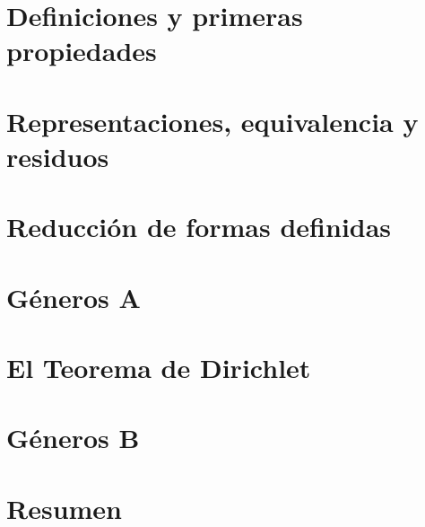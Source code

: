 \section{Definiciones y primeras propiedades}\label{sec:definiciones}


\section{Representaciones, equivalencia y residuos}\label{sec:representaciones}


\section{Reducci\'on de formas definidas}\label{sec:reducidas}


\section{G\'eneros A}\label{sec:generos:a}


\section{El Teorema de Dirichlet}\label{sec:dirichlet}


\section{G\'eneros B}\label{sec:generos:b}


\section{Resumen}\label{sec:resumen}


